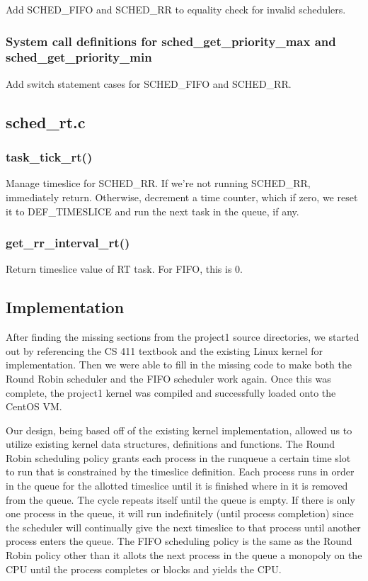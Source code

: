 \documentclass[11pt,letterpaper]{article}
\begin{document}
Add SCHED\_FIFO and SCHED\_RR to equality check for invalid schedulers.

\subsubsection{System call definitions for sched\_get\_priority\_max and sched\_get\_priority\_min}

Add switch statement cases for SCHED\_FIFO and SCHED\_RR.



\subsection{sched\_rt.c}

\subsubsection{task\_tick\_rt()}

Manage timeslice for SCHED\_RR. If we're not running SCHED\_RR, immediately return. Otherwise, decrement a time counter, which if zero, we reset it to DEF\_TIMESLICE and run the next task in the queue, if any.

\subsubsection{get\_rr\_interval\_rt()}

Return timeslice value of RT task. For FIFO, this is 0.


\subsection{Implementation}

After finding the missing sections from the project1 source directories, we started out by referencing the CS 411 textbook and the existing Linux kernel for implementation. Then we were able to fill in the missing code to make both the Round Robin scheduler and the FIFO scheduler work again. Once this was complete, the project1 kernel was compiled and successfully loaded onto the CentOS VM. 

Our design, being based off of the existing kernel implementation, allowed us to utilize existing kernel data structures, definitions and functions. The Round Robin scheduling policy grants each process in the runqueue a certain time slot to run that is constrained by the timeslice definition. Each process runs in order in the queue for the allotted timeslice until it is finished where in it is removed from the queue. The cycle repeats itself until the queue is empty. If there is only one process in the queue, it will run indefinitely (until process completion) since the scheduler will continually give the next timeslice to that process until another process enters the queue. The FIFO scheduling policy is the same as the Round Robin policy other than it allots the next process in the queue a monopoly on the CPU until the process completes or blocks and yields the CPU.
\end{document}
